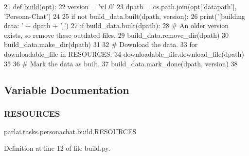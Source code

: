 \begin{DoxyCode}
21 \textcolor{keyword}{def }\hyperlink{namespacedialog__babi__feedback_1_1build_a7a9d289f7493a5ded13c4b7f071b6184}{build}(opt):
22     version = \textcolor{stringliteral}{'v1.0'}
23     dpath = os.path.join(opt[\textcolor{stringliteral}{'datapath'}], \textcolor{stringliteral}{'Persona-Chat'})
24 
25     \textcolor{keywordflow}{if} \textcolor{keywordflow}{not} build\_data.built(dpath, version):
26         print(\textcolor{stringliteral}{'[building data: '} + dpath + \textcolor{stringliteral}{']'})
27         \textcolor{keywordflow}{if} build\_data.built(dpath):
28             \textcolor{comment}{# An older version exists, so remove these outdated files.}
29             build\_data.remove\_dir(dpath)
30         build\_data.make\_dir(dpath)
31 
32         \textcolor{comment}{# Download the data.}
33         \textcolor{keywordflow}{for} downloadable\_file \textcolor{keywordflow}{in} RESOURCES:
34             downloadable\_file.download\_file(dpath)
35 
36         \textcolor{comment}{# Mark the data as built.}
37         build\_data.mark\_done(dpath, version)
38 \end{DoxyCode}


\subsection{Variable Documentation}
\mbox{\label{namespaceparlai_1_1tasks_1_1personachat_1_1build_aae5953cb3f3d421372f4a7eea2b1dd69}} 
\subsubsection{\texorpdfstring{R\+E\+S\+O\+U\+R\+C\+ES}{RESOURCES}}
{\footnotesize\ttfamily parlai.\+tasks.\+personachat.\+build.\+R\+E\+S\+O\+U\+R\+C\+ES}



Definition at line 12 of file build.\+py.

